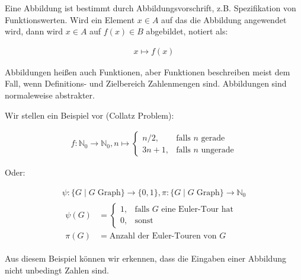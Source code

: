 \documentclass[12pt,a4paper,oneside]{article}
\newcommand{\emptyline}{\hspace*{\fill}}
\newcommand{\N}{\mathbb{N}}
\begin{document}
        \emptyline

        Eine Abbildung ist bestimmt durch Abbildungsvorschrift, z.B. Spezifikation von Funktionswerten.
        Wird ein Element $x \in A$ auf das die Abbildung angewendet wird,
        dann wird $x \in A$ auf $f(x) \in B$ abgebildet, notiert als:

        \vspace{-1em}
        \begin{align*}
            x \mapsto f(x)
        \end{align*}

        Abbildungen heißen auch Funktionen, aber Funktionen beschreiben meist dem Fall, wenn Definitions- und Zielbereich Zahlenmengen sind.
        Abbildungen sind normaleweise abstrakter.

        \emptyline

        Wir stellen ein Beispiel vor (Collatz Problem):

        \vspace{-1em}
        \begin{align*}
            f: \N_0 \to \N_0, n \mapsto
            \begin{cases}
                n / 2, &\text{falls $n$ gerade} \\
                3n + 1, &\text{falls $n$ ungerade}
            \end{cases}
        \end{align*}

        Oder:

        \vspace{-1em}
        \begin{gather*}
            \psi: \{G \;|\; G \;\text{Graph}\} \to \{0, 1\}, \pi: \{G \;|\; G \;\text{Graph}\} \to \N_0 \\
            \begin{aligned}
                \psi(G) &=
                \begin{cases}
                    1, &\text{falls $G$ eine Euler-Tour hat} \\
                    0, &\text{sonst}
                \end{cases} \\
                    \pi(G) &= \text{Anzahl der Euler-Touren von $G$}
            \end{aligned}
        \end{gather*}

        Aus diesem Beispiel können wir erkennen, dass die Eingaben einer Abbildung nicht unbedingt Zahlen sind.
\end{document}
